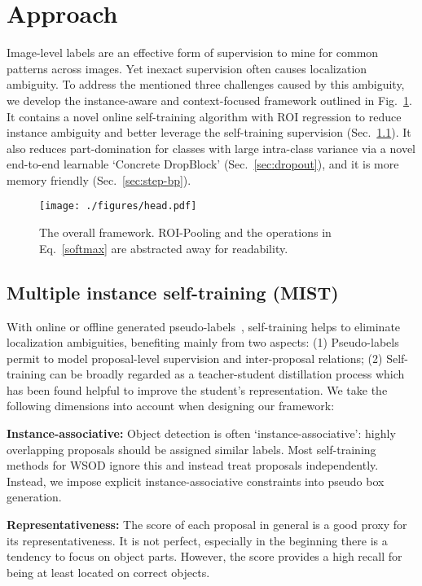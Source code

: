 \documentclass[10pt,twocolumn,letterpaper]{article}
\begin{document}
 \section{Approach}
\label{sec:approach}
Image-level labels are an effective form of supervision to mine for common patterns across images. Yet inexact supervision often causes localization ambiguity. To address the mentioned three challenges caused by this ambiguity, we develop the instance-aware and context-focused framework outlined in Fig.~\ref{fig:head}. It contains a novel online self-training algorithm with ROI regression to reduce instance ambiguity and better leverage the self-training supervision (Sec.~\ref{sec:refine}). It also reduces part-domination for classes with large intra-class variance via a novel end-to-end learnable `Concrete DropBlock' (Sec.~\ref{sec:dropout}), and it is more memory friendly (Sec.~\ref{sec:step-bp}). 

\begin{figure}[t]
\centering
\texttt{[image: ./figures/head.pdf]}
\caption{The overall framework. ROI-Pooling and the operations in Eq.~\eqref{softmax} are abstracted away for readability.}
\label{fig:head}
\vspace{-1em}
\end{figure}

\subsection{Multiple instance self-training (MIST)}
\label{sec:refine}

With online or offline generated pseudo-labels~\cite{tang2018pcl, krishna-cvpr2016, Zhang_2018_CVPR}, self-training helps to eliminate localization ambiguities, benefiting mainly from two aspects: (1) Pseudo-labels permit to model proposal-level supervision and inter-proposal relations; (2) Self-training can be broadly regarded as a teacher-student distillation process which has been found helpful to improve the student's representation. We take the following dimensions into account when designing our framework: 

\noindent\textbf{Instance-associative:} Object detection is often `instance-associative': highly overlapping proposals should be assigned similar labels. Most self-training methods for WSOD ignore this  and instead treat  proposals  independently. Instead, we impose explicit instance-associative constraints into pseudo box generation. 

\noindent\textbf{Representativeness:} The score of each proposal in general is a good proxy for its representativeness. It is not perfect, especially in the beginning there is a tendency to focus on object parts. However, the score provides a high recall for being at least located on correct objects. 
\end{document}
